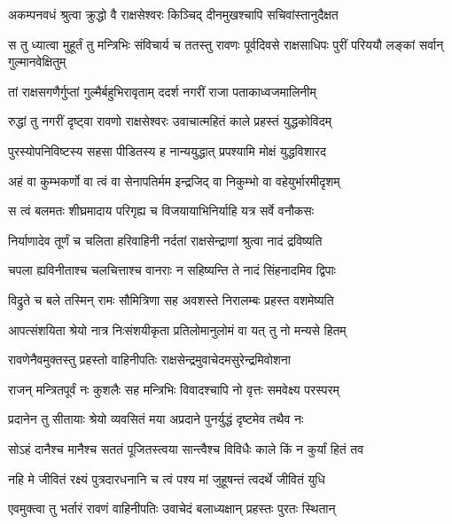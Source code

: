 
\twolineshloka
{अकम्पनवधं श्रुत्वा क्रुद्धो वै राक्षसेश्वरः}
{किञ्चिद् दीनमुखश्चापि सचिवांस्तानुदैक्षत} %

\threelineshloka
{स तु ध्यात्वा मुहूर्तं तु मन्त्रिभिः संविचार्य च}
{ततस्तु रावणः पूर्वदिवसे राक्षसाधिपः}
{पुरीं परिययौ लङ्कां सर्वान् गुल्मानवेक्षितुम्} %

\twolineshloka
{तां राक्षसगणैर्गुप्तां गुल्मैर्बहुभिरावृताम्}
{ददर्श नगरीं राजा पताकाध्वजमालिनीम्} %

\twolineshloka
{रुद्धां तु नगरीं दृष्ट्वा रावणो राक्षसेश्वरः}
{उवाचात्महितं काले प्रहस्तं युद्धकोविदम्} %

\twolineshloka
{पुरस्योपनिविष्टस्य सहसा पीडितस्य ह}
{नान्ययुद्धात् प्रपश्यामि मोक्षं युद्धविशारद} %

\twolineshloka
{अहं वा कुम्भकर्णो वा त्वं वा सेनापतिर्मम}
{इन्द्रजिद् वा निकुम्भो वा वहेयुर्भारमीदृशम्} %

\twolineshloka
{स त्वं बलमतः शीघ्रमादाय परिगृह्य च}
{विजयायाभिनिर्याहि यत्र सर्वे वनौकसः} %

\twolineshloka
{निर्याणादेव तूर्णं च चलिता हरिवाहिनी}
{नर्दतां राक्षसेन्द्राणां श्रुत्वा नादं द्रविष्यति} %

\twolineshloka
{चपला ह्यविनीताश्च चलचित्ताश्च वानराः}
{न सहिष्यन्ति ते नादं सिंहनादमिव द्विपाः} %

\twolineshloka
{विद्रुते च बले तस्मिन् रामः सौमित्रिणा सह}
{अवशस्ते निरालम्बः प्रहस्त वशमेष्यति} %

\twolineshloka
{आपत्संशयिता श्रेयो नात्र निःसंशयीकृता}
{प्रतिलोमानुलोमं वा यत् तु नो मन्यसे हितम्} %

\twolineshloka
{रावणेनैवमुक्तस्तु प्रहस्तो वाहिनीपतिः}
{राक्षसेन्द्रमुवाचेदमसुरेन्द्रमिवोशना} %

\twolineshloka
{राजन् मन्त्रितपूर्वं नः कुशलैः सह मन्त्रिभिः}
{विवादश्चापि नो वृत्तः समवेक्ष्य परस्परम्} %

\twolineshloka
{प्रदानेन तु सीतायाः श्रेयो व्यवसितं मया}
{अप्रदाने पुनर्युद्धं दृष्टमेव तथैव नः} %

\twolineshloka
{सोऽहं दानैश्च मानैश्च सततं पूजितस्त्वया}
{सान्त्वैश्च विविधैः काले किं न कुर्यां हितं तव} %

\twolineshloka
{नहि मे जीवितं रक्ष्यं पुत्रदारधनानि च}
{त्वं पश्य मां जुहूषन्तं त्वदर्थे जीवितं युधि} %

\twolineshloka
{एवमुक्त्वा तु भर्तारं रावणं वाहिनीपतिः}
{उवाचेदं बलाध्यक्षान् प्रहस्तः पुरतः स्थितान्} %

